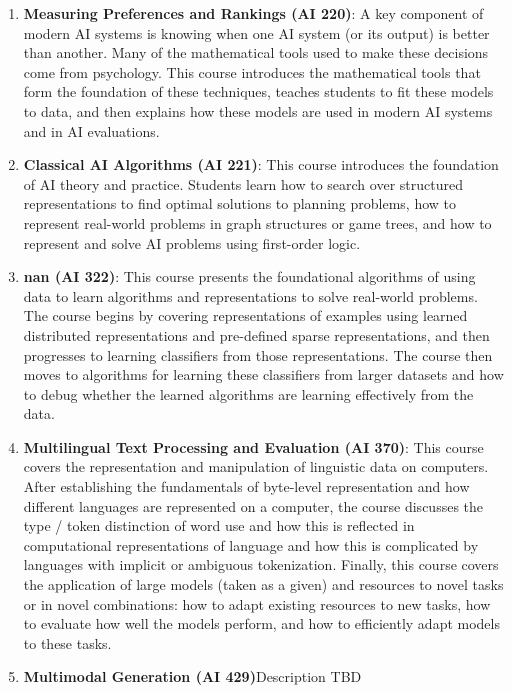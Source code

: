 \begin{enumerate}
\item \textbf{Measuring Preferences and Rankings (AI 220)}: A key component of modern AI systems is knowing when one AI system (or its output) is better than another.  Many of the mathematical tools used to make these decisions come from psychology.  This course introduces the mathematical tools that form the foundation of these techniques, teaches students to fit these models to data, and then explains how these models are used in modern AI systems and in AI evaluations.
\item \textbf{Classical AI Algorithms (AI 221)}: This course introduces the foundation of AI theory and practice.  Students learn how to search over structured representations to find optimal solutions to planning problems, how to represent real-world problems in graph structures or game trees, and how to represent and solve AI problems using first-order logic.
\item \textbf{nan (AI 322)}: This course presents the foundational algorithms of using data to learn algorithms and representations to solve real-world problems.  The course begins by covering representations of examples using learned distributed representations and pre-defined sparse representations, and then progresses to learning classifiers from those representations.  The course then moves to algorithms for learning these classifiers from larger datasets and how to debug whether the learned algorithms are learning effectively from the data.
\item \textbf{Multilingual Text Processing and Evaluation (AI 370)}: This course covers the representation and manipulation of linguistic data on computers.  After establishing the fundamentals of byte-level representation and how different languages are represented on a computer, the course discusses the type / token distinction of word use and how this is reflected in computational representations of language and how this is complicated by languages with implicit or ambiguous tokenization.  Finally, this course covers the application of large models (taken as a given) and resources to novel tasks or in novel combinations: how to adapt existing resources to new tasks, how to evaluate how well the models perform, and how to efficiently adapt models to these tasks.  
\item \textbf{Multimodal Generation (AI 429)}Description TBD
\end{enumerate}